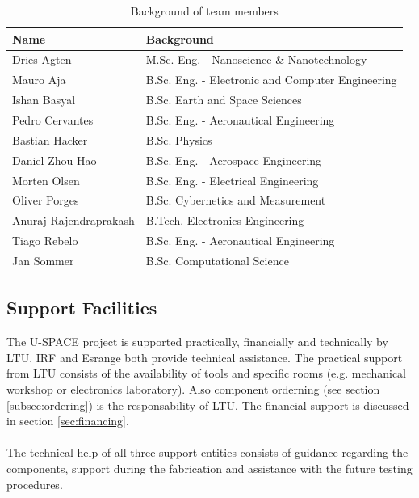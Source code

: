 \begin{table}[h]
\centering
\caption{Background of team members}
\begin{tabular}{l l}
\hline
\textbf{Name} & \textbf{Background} \\
\hline
Dries Agten & M.Sc. Eng. - Nanoscience \& Nanotechnology \\
Mauro Aja & B.Sc. Eng. - Electronic and Computer Engineering \\
Ishan Basyal & B.Sc. Earth and Space Sciences  \\
Pedro Cervantes & B.Sc. Eng. - Aeronautical Engineering \\
Bastian Hacker & B.Sc. Physics\\
Daniel Zhou Hao & B.Sc. Eng. - Aerospace Engineering\\
Morten Olsen & B.Sc. Eng. - Electrical Engineering \\
Oliver Porges & B.Sc. Cybernetics and Measurement  \\
Anuraj Rajendraprakash & B.Tech. Electronics Engineering \\
Tiago Rebelo & B.Sc. Eng. - Aeronautical Engineering \\
Jan Sommer & B.Sc. Computational Science \\
\hline
\end{tabular}
\label{tab:backgrounds}
\end{table}

\subsection{Support Facilities}

The \ac{U-SPACE} project is supported practically, financially and technically by \ac{LTU}. \ac{IRF} and Esrange both provide technical assistance. The practical support from \ac{LTU} consists of the availability of tools and specific rooms (e.g. mechanical workshop or electronics laboratory). Also component orderning (see section \ref{subsec:ordering}) is the responsability of \ac{LTU}. The financial support is discussed in section \ref{sec:financing}.
\\
\\
The technical help of all three support entities consists of guidance regarding the components, support during the fabrication and assistance with the future testing procedures.


